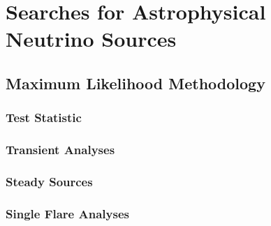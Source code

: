 \chapter{Searches for Astrophysical Neutrino Sources}
\label{sec:nusources}



\section{Maximum Likelihood Methodology}
\label{sec:nusources:lieklihood}


\subsection{Test Statistic}
\label{sec:nusources:TS}


\subsection{Transient Analyses}
\label{sec:nusources:transient}

\subsection{Steady Sources}
\label{sec:nusources:steady}

\subsection{Single Flare Analyses}
\label{sec:nusources:flare}


